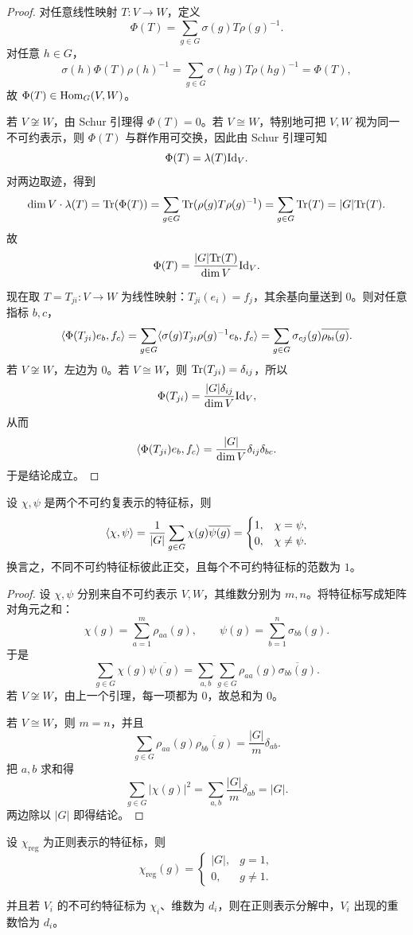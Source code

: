 \begin{proof}
对任意线性映射 $T:V\to W$，定义
\[
\Phi(T)=\sum_{g\in G}\sigma(g)T\rho(g)^{-1}.
\]
对任意 $h\in G$，
\[
\sigma(h)\Phi(T)\rho(h)^{-1}
=\sum_{g\in G}\sigma(hg)T\rho(hg)^{-1}=
\Phi(T),
\]
故 $\Phi(T)\in \mathrm{Hom}_G(V,W)$。

若 $V\not\cong W$，由 Schur 引理得 $\Phi(T)=0$。若 $V\cong W$，特别地可把 $V,W$ 视为同一不可约表示，则 $\Phi(T)$ 与群作用可交换，因此由 Schur 引理可知
\[
\Phi(T)=\lambda(T)\mathrm{Id}_V.
\]
对两边取迹，得到
\[
\dim V\cdot \lambda(T)=\mathrm{Tr}(\Phi(T))
=\sum_{g\in G}\mathrm{Tr}(\rho(g)T\rho(g)^{-1})
=\sum_{g\in G}\mathrm{Tr}(T)=|G|\mathrm{Tr}(T).
\]
故
\[
\Phi(T)=\frac{|G|\mathrm{Tr}(T)}{\dim V}\mathrm{Id}_V.
\]

现在取 $T=T_{ji}:V\to W$ 为线性映射：$T_{ji}(e_i)=f_j$，其余基向量送到 $0$。则对任意指标 $b,c$，
\[
\langle \Phi(T_{ji})e_b, f_c \rangle
=\sum_{g\in G}\langle \sigma(g)T_{ji}\rho(g)^{-1}e_b, f_c \rangle
=\sum_{g\in G}\sigma_{cj}(g)\overline{\rho_{bi}(g)}.
\]
若 $V\not\cong W$，左边为 $0$。若 $V\cong W$，则 $\mathrm{Tr}(T_{ji})=\delta_{ij}$，所以
\[
\Phi(T_{ji})=\frac{|G|\delta_{ij}}{\dim V}\mathrm{Id}_V,
\]
从而
\[
\langle \Phi(T_{ji})e_b, f_c \rangle=\frac{|G|}{\dim V}\delta_{ij}\delta_{bc}.
\]
于是结论成立。
\end{proof}

\begin{theorem}[第一正交关系]
设 $\chi,\psi$ 是两个不可约复表示的特征标，则
\[
\langle \chi, \psi \rangle=\frac{1}{|G|}\sum_{g\in G}\chi(g)\overline{\psi(g)}=
\begin{cases}
1,& \chi=\psi,\\
0,& \chi\neq \psi.
\end{cases}
\]
换言之，不同不可约特征标彼此正交，且每个不可约特征标的范数为 $1$。
\end{theorem}

\begin{proof}
设 $\chi,\psi$ 分别来自不可约表示 $V,W$，其维数分别为 $m,n$。将特征标写成矩阵对角元之和：
\[
\chi(g)=\sum_{a=1}^m \rho_{aa}(g),
\qquad
\psi(g)=\sum_{b=1}^n \sigma_{bb}(g).
\]
于是
\[
\sum_{g\in G}\chi(g)\overline{\psi(g)}
=\sum_{a,b}\sum_{g\in G}\rho_{aa}(g)\overline{\sigma_{bb}(g)}.
\]
若 $V\not\cong W$，由上一个引理，每一项都为 $0$，故总和为 $0$。

若 $V\cong W$，则 $m=n$，并且
\[
\sum_{g\in G}\rho_{aa}(g)\overline{\rho_{bb}(g)}
=\frac{|G|}{m}\delta_{ab}.
\]
把 $a,b$ 求和得
\[
\sum_{g\in G}|\chi(g)|^2
=\sum_{a,b}\frac{|G|}{m}\delta_{ab}=|G|.
\]
两边除以 $|G|$ 即得结论。
\end{proof}

\begin{proposition}[正则表示的特征标]
设 $\chi_{\mathrm{reg}}$ 为正则表示的特征标，则
\[
\chi_{\mathrm{reg}}(g)=
\begin{cases}
|G|, & g=1,\\
0, & g\neq 1.
\end{cases}
\]

并且若 $V_i$ 的不可约特征标为 $\chi_i$、维数为 $d_i$，则在正则表示分解中，$V_i$ 出现的重数恰为 $d_i$。
\end{proposition}

